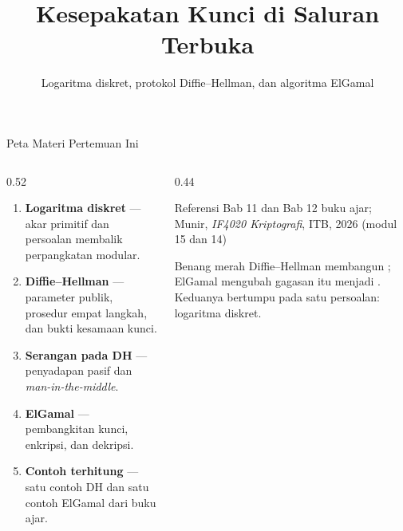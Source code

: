 \documentclass[aspectratio=169,11pt]{beamer}
\title{Kesepakatan Kunci di Saluran Terbuka}
\subtitle{Logaritma diskret, protokol Diffie--Hellman, dan algoritma ElGamal}
\begin{document}
\begin{frame}[plain]
    \titlepage
\end{frame}

\begin{frame}{Peta Materi Pertemuan Ini}
    \begin{columns}[T,onlytextwidth]
        \begin{column}{0.52\textwidth}
            \footnotesize
            \begin{enumerate}
                \item \textbf{Logaritma diskret} --- akar primitif dan
                      persoalan membalik perpangkatan modular.
                \item \textbf{Diffie--Hellman} --- parameter publik, prosedur
                      empat langkah, dan bukti kesamaan kunci.
                \item \textbf{Serangan pada DH} --- penyadapan pasif dan
                      \textit{man-in-the-middle}.
                \item \textbf{ElGamal} --- pembangkitan kunci, enkripsi, dan
                      dekripsi.
                \item \textbf{Contoh terhitung} --- satu contoh DH dan satu
                      contoh ElGamal dari buku ajar.
            \end{enumerate}
        \end{column}
        \begin{column}{0.44\textwidth}
            \begin{block}{Referensi}
                \footnotesize
                Bab 11 dan Bab 12 buku ajar; Munir, \textit{IF4020
                Kriptografi}, ITB, 2026 (modul 15 dan 14)
            \end{block}
            \begin{exampleblock}{Benang merah}
                \footnotesize
                Diffie--Hellman membangun ;
                ElGamal mengubah gagasan itu menjadi .
                Keduanya bertumpu pada satu persoalan: logaritma diskret.
            \end{exampleblock}
        \end{column}
    \end{columns}
\end{frame}
\end{document}
